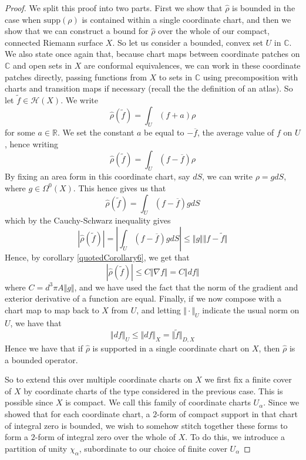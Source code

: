 \documentclass[11pt]{report}
\theoremstyle{definition}
\begin{document}
\begin{proof}
  We split this proof into two parts. First we show that $\hat{\rho}$ is bounded in the case when $\text{supp}(\rho)$ is contained within a single coordinate chart, and then we show that we can construct a bound for $\hat{\rho}$ over the whole of our compact, connected Riemann surface $X$.
  So let us consider a bounded, convex set $U$ in $\mathbb{C}$. We also state once again that, because chart maps between coordinate patches on $\mathbb{C}$ and open sets in $X$ are conformal equivalences, we can work in these coordinate patches directly, passing functions from $X$ to sets in $\mathbb{C}$ using precomposition with charts and transition maps if necessary (recall the the definition of an atlas).
  So let $\tilde{f} \in \mathcal{H}(X)$. We write 
  \[\hat{\rho}(\tilde{f}) = \int_U (f + a) \rho\] 
  for some $a \in \mathbb{R}$. We set the constant $a$ be equal to $-\overline{f}$, the average value of $f$ on $U$, hence writing 
  \[\hat{\rho}(\tilde{f}) = \int_U (f - \overline{f}) \rho\]
  By fixing an area form in this coordinate chart, say $dS$, we can write $\rho = g dS$, where $g \in \Omega^0(X)$. This hence gives us that 
  \[\hat{\rho}(\tilde{f}) = \int_U (f - \overline{f}) g dS\] which by the Cauchy-Schwarz inequality gives
  \[ |\hat{\rho}(\tilde{f})| = \left| \int_U (f - \overline{f}) g dS \right| \leq \Vert g \Vert \Vert f-\tilde{f} \Vert  \]
  Hence, by corollary \ref{quotedCorollary6}, we get that 
  \[ |\hat{\rho}(\tilde{f})| \leq C \Vert \nabla f \Vert = C \Vert df \Vert\] where $C = d^3\pi A \Vert g \Vert$, and we have used the fact that the norm of the gradient and exterior derivative of a function are equal.
  Finally, if we now compose with a chart map to map back to $X$ from $U$, and letting $ \Vert \cdot \Vert_U$ indicate the usual norm on $U$, we have that \[ \Vert df \Vert_U \leq \Vert df \Vert_X = \Vert \tilde{f} \Vert_{D,X}\]
  Hence we have that if $\hat{\rho}$ is supported in a single coordinate chart on $X$, then $\hat{\rho}$ is a bounded operator.

  So to extend this over multiple coordinate charts on $X$ we first fix a finite cover of $X$ by coordinate charts of the type considered in the previous case. This is possible since $X$ is compact. We call this family of coordinate charts $U_{\alpha}$. Since we showed that for each coordinate chart, a $2$-form of compact support in that chart of integral zero is bounded, we wish to somehow stitch together these forms to form a $2$-form of integral zero over the whole of $X$. To do this, we introduce a partition of unity $\chi_{\alpha}$, subordinate to our choice of finite cover $U_{\alpha}$
  

\end{proof}
\end{document}
